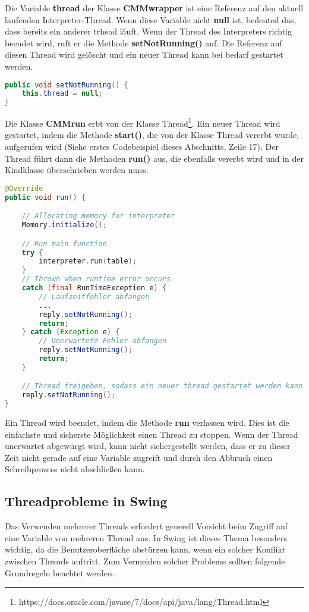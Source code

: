 Die Variable \textbf{thread} der Klasse \textbf{CMMwrapper} ist eine Referenz auf den aktuell laufenden Interpreter-Thread. Wenn diese Variable nicht \textbf{null} ist, bedeuted das, dass bereits ein anderer trhead läuft. Wenn der Thread des Interpreters richtig beendet wird, ruft er die Methode \textbf{setNotRunning()} auf. Die Referenz auf diesen Thread wird gelöscht und ein neuer Thread kann bei bedarf gestartet werden.
\begin{lstlisting}[language=JAVA]
public void setNotRunning() {
	this.thread = null;
}
\end{lstlisting}

Die Klasse \textbf{CMMrun} erbt von der Klasse Thread\footnote{https://docs.oracle.com/javase/7/docs/api/java/lang/Thread.html}. Ein neuer Thread wird gestartet, indem die Methode \textbf{start()}, die von der Klasse Thread vererbt wurde, aufgerufen wird (Siehe erstes Codebeispiel dieses Abschnitts, Zeile 17). Der Thread führt dann die Methoden \textbf{run()} aus, die ebenfalls vererbt wird und in der Kindklasse überschrieben werden muss.
\begin{lstlisting}[language=JAVA]
@Override
public void run() {

	// Allocating memory for interpreter
	Memory.initialize();

	// Run main function
	try {
		interpreter.run(table);
	}
	// Thrown when runtime error occurs
	catch (final RunTimeException e) {
		// Laufzeitfehler abfangen
		... 
		reply.setNotRunning();
		return;
	} catch (Exception e) {
		// Unerwartete Fehler abfangen
		reply.setNotRunning();
		return;
	}

	// Thread freigeben, sodass ein neuer thread gestartet werden kann
	reply.setNotRunning();
}
\end{lstlisting}

Ein Thread wird beendet, indem die Methode \textbf{run} verlassen wird. Dies ist die einfachste und sicherste Möglichkeit einen Thread zu stoppen. Wenn der Thread unerwartet \glqq{}abgewürgt\grqq{} wird, kann nicht sichergestellt werden, dass er zu dieser Zeit nicht gerade auf eine Variable zugreift und durch den Abbruch einen Schreibprozess nicht abschließen kann.

\subsection{Threadprobleme in Swing}
Das Verwenden mehrerer Threads erfordert generell Vorsicht beim Zugriff auf eine Variable von mehreren Thread aus. In Swing ist dieses Thema besonders wichtig, da die Benutzeroberfläche abstürzen kann, wenn ein solcher Konflikt zwischen Threads auftritt. Zum Vermeiden solcher Probleme sollten folgende Grundregeln beachtet werden.

